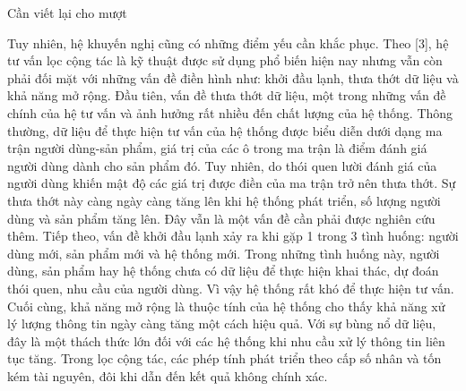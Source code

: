 Cần viết lại cho mượt

Tuy nhiên, hệ khuyến nghị cũng có những điểm yếu cần khắc phục. Theo [3], hệ tư vấn lọc cộng tác là kỹ thuật được sử dụng phổ biến hiện nay nhưng vẫn còn phải đối mặt với những vấn đề điền hình như: khởi đầu lạnh, thưa thớt dữ liệu và khả năng mở rộng. Đầu tiên, vấn đề thưa thớt dữ liệu, một trong những vấn đề chính của hệ tư vấn và ảnh hưởng rất nhiều đến chất lượng của hệ thống. Thông thường, dữ liệu để thực hiện tư vấn của hệ thống được biểu diễn dưới dạng ma trận người dùng-sản phẩm, giá trị của các ô trong ma trận là điểm đánh giá người dùng dành cho sản phẩm đó. Tuy nhiên, do thói quen lười đánh giá của người dùng khiến mật độ các giá trị được điền của ma trận
trở nên thưa thớt. Sự thưa thớt này càng ngày càng tăng lên khi hệ thống phát triển, số
lượng người dùng và sản phẩm tăng lên. Đây vẫn là một vấn đề cần phải được nghiên
cứu thêm. Tiếp theo, vấn đề khởi đầu lạnh xảy ra khi gặp 1 trong 3 tình huống: người dùng
mới, sản phẩm mới và hệ thống mới. Trong những tình huống này, người dùng, sản
phẩm hay hệ thống chưa có dữ liệu để thực hiện khai thác, dự đoán thói quen, nhu cầu
của người dùng. Vì vậy hệ thống rất khó để thực hiện tư vấn. Cuối cùng, khả năng mở rộng là thuộc tính của hệ thống cho thấy khả năng xử lý
lượng thông tin ngày càng tăng một cách hiệu quả. Với sự bùng nổ dữ liệu, đây là một
thách thức lớn đối với các hệ thống khi nhu cầu xử lý thông tin liên tục tăng. Trong lọc
cộng tác, các phép tính phát triển theo cấp số nhân và tốn kém tài nguyên, đôi khi dẫn
đến kết quả không chính xác.